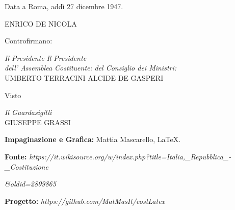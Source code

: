 \documentclass{article}
\begin{document}
\newpage
\begin{center}
	
	\large
     Data a Roma, addì 27 dicembre 1947.
	\vspace*{1cm}
	
	\Large ENRICO DE NICOLA
	\vspace*{0.5cm}
	\large
	
	Controfirmano:
	\vspace{5mm}
	
	\textit{Il Presidente}
	\hspace*{4.5cm}\textit{Il Presidente} \\
	\textit{dell' Assemblea Costituente:}
	\hfill
	\textit{del Consiglio dei Ministri:} \\
	\vspace*{3mm}\Large UMBERTO TERRACINI\large
	\hfill
	\Large ALCIDE DE GASPERI\large
	
    \vspace{5mm}
    Visto
    \vspace{5mm}
    
	\textit{Il Guardasigilli}\\
	\vspace{5mm}
	\Large GIUSEPPE GRASSI\large
\end{center}
\newpage
\theendnotes
\newpage
\textbf{Impaginazione e Grafica:} Mattia Mascarello, \LaTeX.

\textbf{Fonte:} \emph{https://it.wikisource.org/w/index.php?title=Italia,\_Repubblica\_-\_Costituzione}

\textit{\&oldid=2899865}

\textbf{Progetto:}
\emph{https://github.com/MatMasIt/costLatex}
\end{document}
